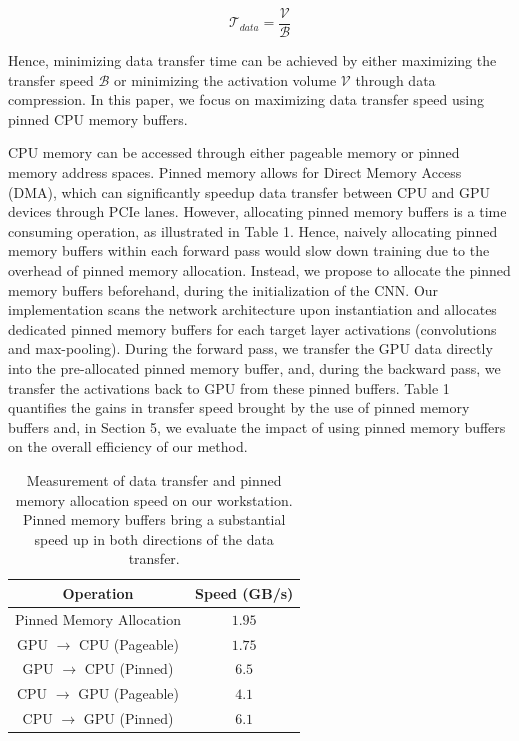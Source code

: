 \documentclass[11pt,onecolumn]{article}
\begin{document}
\begin{equation}
\mathcal{T}_{data} = \frac{\mathcal{V}}{\mathcal{B}}
\end{equation}

Hence, minimizing data transfer time can be achieved by either
maximizing the transfer speed $\mathcal{B}$ or minimizing
the activation volume $\mathcal{V}$ through data compression.
In this paper, we focus on maximizing data transfer speed using pinned
CPU memory buffers.

CPU memory can be accessed through either pageable memory 
or pinned memory address spaces.
Pinned memory allows for Direct Memory Access (DMA), 
which can significantly speedup data transfer between CPU and GPU devices through PCIe lanes.
However, allocating pinned memory buffers is a time consuming operation, as illustrated in Table 1.
Hence, naively allocating pinned memory buffers within each forward pass would
slow down training due to the overhead of pinned memory allocation.
Instead, we propose to allocate the pinned memory buffers beforehand, 
during the initialization of the CNN.
Our implementation scans the network architecture upon instantiation
and allocates dedicated pinned memory buffers for each 
target layer activations (convolutions and max-pooling). 
During the forward pass, we transfer the GPU data directly into the pre-allocated pinned memory buffer,
and, during the backward pass, we transfer the activations back to GPU from these pinned buffers.
Table 1 quantifies the gains in transfer speed brought by the use of pinned memory buffers and, in Section 5, we evaluate the impact of using pinned memory buffers on the overall efficiency of our method.

\begin{table}[t]
\begin{center}
\begin{tabular}{ c c }	
\hline
Operation     & Speed (GB/s)  \\
\hline
Pinned Memory Allocation     		&  $1.95$        \\
GPU $\rightarrow$ CPU (Pageable)	&  $1.75$        \\
GPU $\rightarrow$ CPU (Pinned)	        &  $6.5$          \\
CPU $\rightarrow$ GPU (Pageable)	&  $4.1$          \\
CPU $\rightarrow$ GPU (Pinned)	        &  $6.1$          \\
\hline
\end{tabular}
\caption{Measurement of data transfer and pinned memory allocation speed on our workstation.
Pinned memory buffers bring a substantial speed up in both directions of the data transfer.}
\end{center}
\end{table}
\end{document}
